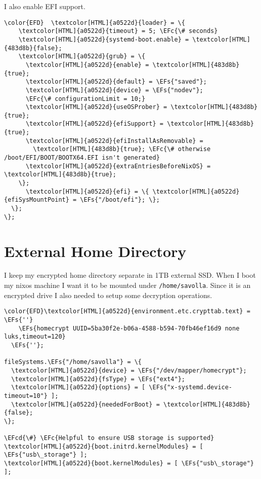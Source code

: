 \documentclass[14pt]{article}
\newcommand{\EFc}[1]{\textcolor{EFc}{#1}} %
\newcommand{\EFcd}[1]{\textcolor{EFcd}{#1}} %
\newcommand{\EFs}[1]{\textcolor{EFs}{#1}} %
\begin{document}
I also enable EFI support.
\begin{Code}
\begin{Verbatim}
\color{EFD}  \textcolor[HTML]{a0522d}{loader} = \{
    \textcolor[HTML]{a0522d}{timeout} = 5; \EFc{\# seconds}
    \textcolor[HTML]{a0522d}{systemd-boot.enable} = \textcolor[HTML]{483d8b}{false};
    \textcolor[HTML]{a0522d}{grub} = \{
      \textcolor[HTML]{a0522d}{enable} = \textcolor[HTML]{483d8b}{true};
      \textcolor[HTML]{a0522d}{default} = \EFs{"saved"};
      \textcolor[HTML]{a0522d}{device} = \EFs{"nodev"};
      \EFc{\# configurationLimit = 10;}
      \textcolor[HTML]{a0522d}{useOSProber} = \textcolor[HTML]{483d8b}{true};
      \textcolor[HTML]{a0522d}{efiSupport} = \textcolor[HTML]{483d8b}{true};
      \textcolor[HTML]{a0522d}{efiInstallAsRemovable} =
        \textcolor[HTML]{483d8b}{true}; \EFc{\# otherwise /boot/EFI/BOOT/BOOTX64.EFI isn't generated}
      \textcolor[HTML]{a0522d}{extraEntriesBeforeNixOS} = \textcolor[HTML]{483d8b}{true};
    \};
      \textcolor[HTML]{a0522d}{efi} = \{ \textcolor[HTML]{a0522d}{efiSysMountPoint} = \EFs{"/boot/efi"}; \};
  \};
\};
\end{Verbatim}
\end{Code}
\section{External Home Directory}
\label{sec:org0676427}
I keep my encrypted home directory separate in 1TB external SSD. When I boot my nixos machine I want it to be mounted under \texttt{/home/savolla}. Since it is an encrypted drive I also needed to setup some decryption operations.

\begin{Code}
\begin{Verbatim}
\color{EFD}\textcolor[HTML]{a0522d}{environment.etc.crypttab.text} = \EFs{''}
    \EFs{homecrypt UUID=5ba30f2e-b06a-4588-b594-70fb46ef16d9 none luks,timeout=120}
  \EFs{''};

fileSystems.\EFs{"/home/savolla"} = \{
  \textcolor[HTML]{a0522d}{device} = \EFs{"/dev/mapper/homecrypt"};
  \textcolor[HTML]{a0522d}{fsType} = \EFs{"ext4"};
  \textcolor[HTML]{a0522d}{options} = [ \EFs{"x-systemd.device-timeout=10"} ];
  \textcolor[HTML]{a0522d}{neededForBoot} = \textcolor[HTML]{483d8b}{false};
\};

\EFcd{\#} \EFc{Helpful to ensure USB storage is supported}
\textcolor[HTML]{a0522d}{boot.initrd.kernelModules} = [ \EFs{"usb\_storage"} ];
\textcolor[HTML]{a0522d}{boot.kernelModules} = [ \EFs{"usb\_storage"} ];
\end{Verbatim}
\end{Code}
\end{document}
